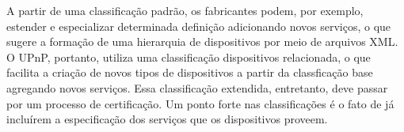 A partir de uma classificação padrão, os fabricantes podem, por exemplo, estender e especializar determinada definição adicionando novos serviços, o que sugere a formação de uma hierarquia de dispositivos por meio de arquivos XML. O UPnP, portanto, utiliza uma classificação dispositivos relacionada, o que facilita a criação de novos tipos de dispositivos a partir da classficação base agregando novos serviços. Essa classificação extendida, entretanto, deve passar por um processo de certificação. Um ponto forte nas classificações é o fato de já incluírem a especificação dos serviços que os dispositivos proveem.
